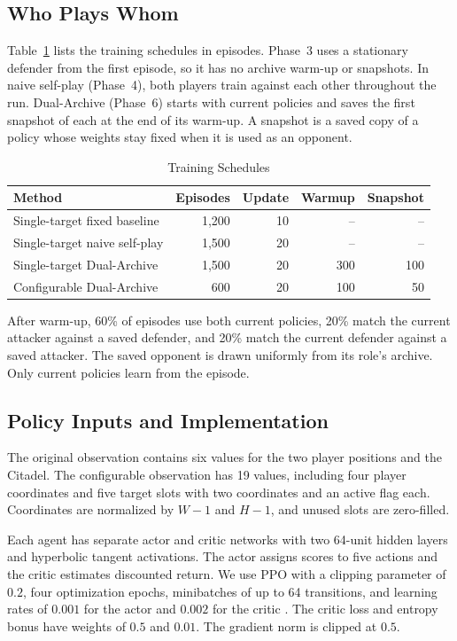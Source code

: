 \documentclass[conference,a4paper]{IEEEtran}
\begin{document}
\subsection{Who Plays Whom}
Table~\ref{tab:training} lists the training schedules in episodes. Phase~3 uses a stationary defender from the first episode, so it has no archive warm-up or snapshots. In naive self-play (Phase~4), both players train against each other throughout the run. Dual-Archive (Phase~6) starts with current policies and saves the first snapshot of each at the end of its warm-up. A snapshot is a saved copy of a policy whose weights stay fixed when it is used as an opponent.
\begin{table}[t]
\caption{Training Schedules}
\label{tab:training}
\centering
\setlength{\tabcolsep}{3pt}
\begin{tabular}{@{}lrrrr@{}}
\toprule
Method & Episodes & Update & Warmup & Snapshot \\
\midrule
Single-target fixed baseline & 1,200 & 10 & -- & -- \\
Single-target naive self-play & 1,500 & 20 & -- & -- \\
Single-target Dual-Archive & 1,500 & 20 & 300 & 100 \\
Configurable Dual-Archive & 600 & 20 & 100 & 50 \\
\bottomrule
\end{tabular}
\end{table}
After warm-up, 60\% of episodes use both current policies, 20\% match the current attacker against a saved defender, and 20\% match the current defender against a saved attacker. The saved opponent is drawn uniformly from its role's archive. Only current policies learn from the episode.

\subsection{Policy Inputs and Implementation}
The original observation contains six values for the two player positions and the Citadel. The configurable observation has 19 values, including four player coordinates and five target slots with two coordinates and an active flag each. Coordinates are normalized by $W-1$ and $H-1$, and unused slots are zero-filled.

Each agent has separate actor and critic networks with two 64-unit hidden layers and hyperbolic tangent activations. The actor assigns scores to five actions and the critic estimates discounted return. We use PPO with a clipping parameter of $0.2$, four optimization epochs, minibatches of up to 64 transitions, and learning rates of $0.001$ for the actor and $0.002$ for the critic \cite{schulman2017proximal}. The critic loss and entropy bonus have weights of $0.5$ and $0.01$. The gradient norm is clipped at $0.5$.
\end{document}
